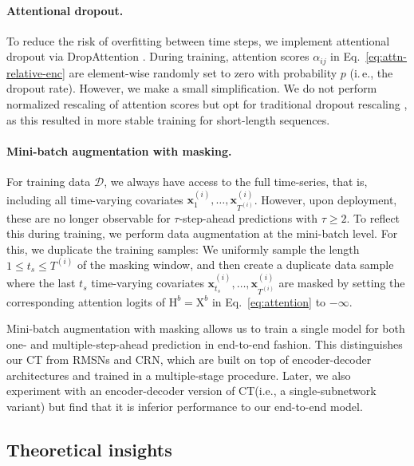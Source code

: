 \documentclass{article}
\newcommand\ie{i.\,e.\xspace}
\theoremstyle{plain}
\theoremstyle{definition}
\theoremstyle{remark}
\newcommand{\shortname}{CT\xspace}
\begin{document}
\paragraph{Attentional dropout.} To reduce the risk of overfitting between time steps, we implement attentional dropout via DropAttention \cite{zehui2019dropattention}. During training, attention scores $\alpha_{ij}$ in Eq.~\eqref{eq:attn-relative-enc} are element-wise randomly set to zero with probability $p$ (\ie, the dropout rate). However, we make a small simplification. We do not perform normalized rescaling \cite{zehui2019dropattention} of attention scores but opt for traditional dropout rescaling \cite{srivastava2014dropout}, as this resulted in more stable training for short-length sequences. 


\paragraph{Mini-batch augmentation with masking.}

For training data $\mathcal{D}$, we always have access to the full time-series, that is, including all time-varying covariates $\mathbf{x}_{1}^{(i)}, \dots, \mathbf{x}_{T^{(i)}}^{(i)}$. However, upon deployment, these are no longer observable for $\tau$-step-ahead predictions with $\tau \ge 2$. To reflect this during training, we perform data augmentation at the mini-batch level. For this, we duplicate the training samples: We uniformly sample the length $1 \leq t_s \leq T^{(i)}$ of the masking window, and then create a duplicate data sample where the last $t_s$ time-varying covariates $\mathbf{x}_{t_s}^{(i)}, \dots, \mathbf{x}_{T^{(i)}}^{(i)}$ are masked by setting the corresponding attention logits of $\mathrm{H}^b = \mathrm{X}^b$ in Eq.~\eqref{eq:attention} to $-\infty$.

Mini-batch augmentation with masking allows us to train a single model for both one- and multiple-step-ahead prediction in end-to-end fashion. This distinguishes our \shortname from RMSNs and CRN, which are built on top of encoder-decoder architectures and trained in a multiple-stage procedure. Later, we also experiment with an encoder-decoder version of \shortname (i.e., a single-subnetwork variant) but find that it is inferior performance to our end-to-end model.


\subsection{Theoretical insights}
\end{document}
